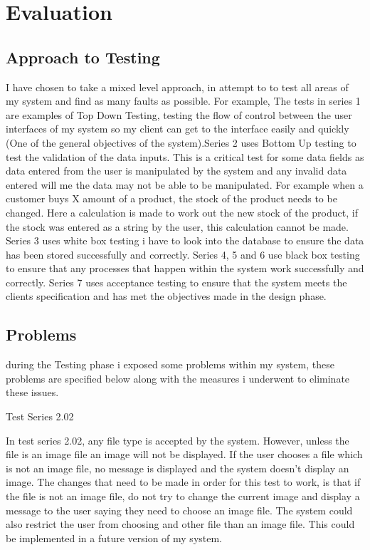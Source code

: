 \section{Evaluation}

\subsection{Approach to Testing}

\begin{flushleft}

I have chosen to take a mixed level approach, in attempt to to test all areas of my system and find as many faults as possible. For example,  The tests in series 1 are examples of Top Down Testing, testing the flow of control between the user interfaces of my system so my client can get to the interface easily and quickly (One of the general objectives of the system).Series 2 uses Bottom Up testing to test the validation of the data inputs. This is a critical test for some data fields as data entered from the user is manipulated by the system and any invalid data entered will me the data may not be able to be manipulated. For example when a customer buys X amount of a product, the stock of the product needs to be changed. Here a calculation is made to work out the new stock of the product, if the stock was entered as a string by the user, this calculation cannot be made. Series 3 uses white box testing i have to look into the database to ensure the data has been stored successfully and correctly. Series 4, 5 and 6 use black box testing to ensure that any processes that happen within the system work successfully and correctly. Series 7 uses acceptance testing to ensure that the system meets the clients specification and has met the objectives made in the design phase.

\subsection{Problems}

during the Testing phase i exposed some problems within my system, these problems are specified below along with the measures i underwent to eliminate these issues. 

Test Series 2.02

In test series 2.02, any file type is accepted by the system. However, unless the file is an image file an image will not be displayed. If the user chooses a file which is not an image file, no message is displayed and the system doesn't display an image. The changes that need to be made in order for this test to work, is that if the file is not an image file, do not try to change the current image and display a message to the user saying they need to choose an image file. The system could also restrict the user from choosing and other file than an image file. This could be implemented in a future version of my system.


\end{flushleft}

